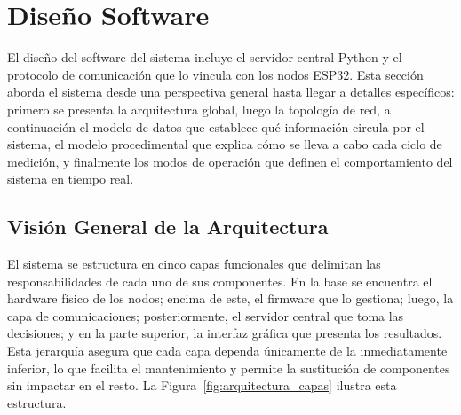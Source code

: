\section{Diseño Software}

El diseño del software del sistema incluye el servidor central Python y el protocolo de comunicación que lo vincula con los nodos ESP32. Esta sección aborda el sistema desde una perspectiva general hasta llegar a detalles específicos: primero se presenta la arquitectura global, luego la topología de red, a continuación el modelo de datos que establece qué información circula por el sistema, el modelo procedimental que explica cómo se lleva a cabo cada ciclo de medición, y finalmente los modos de operación que definen el comportamiento del sistema en tiempo real.

\subsection{Visión General de la Arquitectura}

El sistema se estructura en cinco capas funcionales que delimitan las responsabilidades de cada uno de sus componentes. En la base se encuentra el hardware físico de los nodos; encima de este, el firmware que lo gestiona; luego, la capa de comunicaciones; posteriormente, el servidor central que toma las decisiones; y en la parte superior, la interfaz gráfica que presenta los resultados. Esta jerarquía asegura que cada capa dependa únicamente de la inmediatamente inferior, lo que facilita el mantenimiento y permite la sustitución de componentes sin impactar en el resto. La Figura~\ref{fig:arquitectura_capas} ilustra esta estructura.

